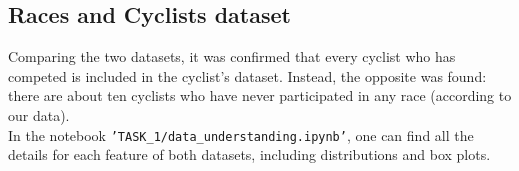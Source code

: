 

\subsection{Races and Cyclists dataset}
Comparing the two datasets, it was confirmed that every cyclist who has competed is included in the cyclist's dataset. Instead, the opposite was found: there are about ten cyclists who have never participated in any race (according to our data).\\

\noindent
In the notebook \texttt{'TASK\_1/data\_understanding.ipynb'}, one can find all the details for each feature of both datasets, including distributions and box plots.\\






